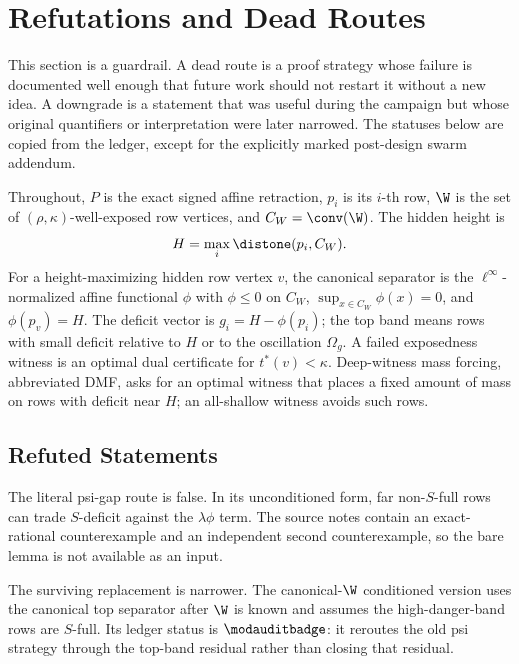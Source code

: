 \section{Refutations and Dead Routes}
\label{sec:refutations-dead-routes}

This section is a guardrail.  A dead route is a proof strategy whose failure is
documented well enough that future work should not restart it without a new idea.  A
downgrade is a statement that was useful during the campaign but whose original
quantifiers or interpretation were later narrowed.  The statuses below are copied from
the ledger, except for the explicitly marked post-design swarm addendum.

Throughout, \(P\) is the exact signed affine retraction, \(p_i\) is its \(i\)-th row,
\(\W\) is the set of \((\rho,\kappa)\)-well-exposed row vertices, and
\(C_W=\conv(\W)\).  The hidden height is
\[
  H=\max_i \distone(p_i,C_W).
\]
For a height-maximizing hidden row vertex \(v\), the canonical separator is the
\(\ell^\infty\)-normalized affine functional \(\phi\) with
\(\phi\le0\) on \(C_W\), \(\sup_{x\in C_W}\phi(x)=0\), and
\(\phi(p_v)=H\).  The deficit vector is
\(g_i=H-\phi(p_i)\); the top band means rows
with small deficit relative to \(H\) or to the oscillation \(\Omega_g\).  A failed
exposedness witness is an optimal dual certificate for \(t^*(v)<\kappa\).  Deep-witness
mass forcing, abbreviated DMF, asks for an optimal witness that places a fixed amount of
mass on rows with deficit near \(H\); an all-shallow witness avoids such rows.

\subsection{Refuted Statements}

\begin{refutedstatement}
 The literal psi-gap route is false.  In its unconditioned form, far
non-\(S\)-full rows can trade \(S\)-deficit against the \(\lambda\phi\) term.  The
source notes contain an exact-rational counterexample and an independent second
counterexample, so the bare lemma is not available as an input.
\end{refutedstatement}

The surviving replacement is narrower.  The canonical-\(\W\) conditioned version uses
the canonical top separator after \(\W\) is known and assumes the high-danger-band rows
are \(S\)-full.  Its ledger status is \(\modauditbadge\): it reroutes the old psi
strategy through the top-band residual rather than closing that residual.

